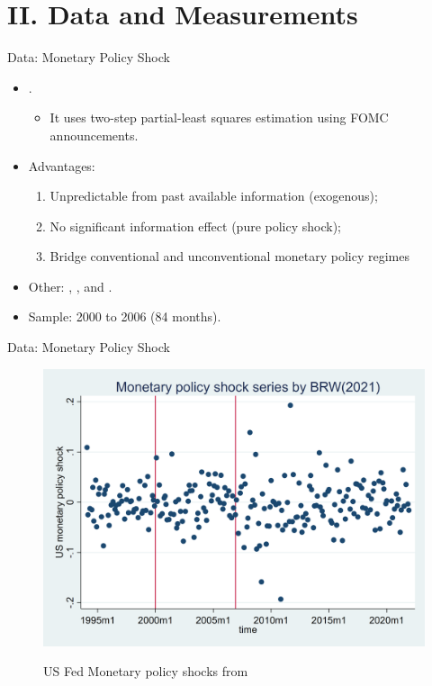 \documentclass[10pt]{beamer}
\begin{document}
\section{II. Data and Measurements}

\begin{frame}{Data: Monetary Policy Shock}
    \begin{itemize}
        \item \cite{bu2021unified}.
        \begin{itemize}
            \item It uses \cite{fama1973risk} two-step partial-least squares estimation using FOMC announcements.
        \end{itemize}
        \item Advantages:
        \begin{enumerate}
            \item Unpredictable from past available information (exogenous);
            \item No significant information effect (pure policy shock);
            \item Bridge conventional and unconventional monetary policy regimes
        \end{enumerate}
        \item Other: \cite{nakamura2018high}, \cite{guraynak2005actions}, and \cite{jarocinski2020deconstructing}.
        \item Sample: 2000 to 2006 (84 months).
    \end{itemize}
\end{frame}

\begin{frame}{Data: Monetary Policy Shock}
    \begin{figure}[htbp]
	\centering
	\includegraphics[width=0.75\columnwidth]{latex/drafts/pic/BRW.png}
	\label{sum.brw}
        \caption{US Fed Monetary policy shocks from \cite{bu2021unified}}
    \end{figure}
\end{frame}
\end{document}
